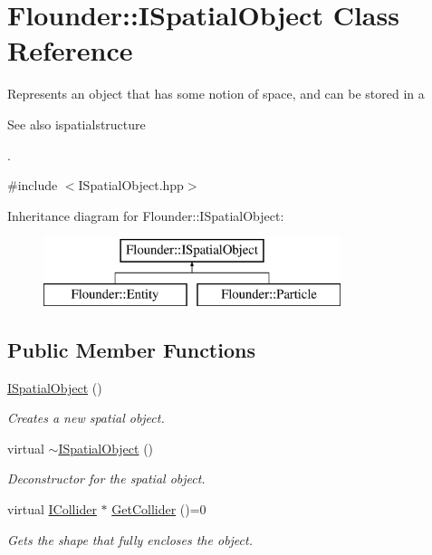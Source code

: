 \hypertarget{class_flounder_1_1_i_spatial_object}{}\section{Flounder\+:\+:I\+Spatial\+Object Class Reference}
\label{class_flounder_1_1_i_spatial_object}


Represents an object that has some notion of space, and can be stored in a \begin{DoxySeeAlso}{See also}
ispatialstructure


\end{DoxySeeAlso}
.  




{\ttfamily \#include $<$I\+Spatial\+Object.\+hpp$>$}

Inheritance diagram for Flounder\+:\+:I\+Spatial\+Object\+:\begin{figure}[H]
\begin{center}
\leavevmode
\includegraphics[height=2.000000cm]{class_flounder_1_1_i_spatial_object}
\end{center}
\end{figure}
\subsection*{Public Member Functions}
\begin{DoxyCompactItemize}
\item 
\hyperlink{class_flounder_1_1_i_spatial_object_a1e5a26ee3cef8547256f88cdc56feefb}{I\+Spatial\+Object} ()
\begin{DoxyCompactList}\small\item\em Creates a new spatial object. \end{DoxyCompactList}\item 
virtual \hyperlink{class_flounder_1_1_i_spatial_object_a146d7d07782ead201107cb8d20448a88}{$\sim$\+I\+Spatial\+Object} ()
\begin{DoxyCompactList}\small\item\em Deconstructor for the spatial object. \end{DoxyCompactList}\item 
virtual \hyperlink{class_flounder_1_1_i_collider}{I\+Collider} $\ast$ \hyperlink{class_flounder_1_1_i_spatial_object_ae1e28211dc94c4229baf284ea10ff556}{Get\+Collider} ()=0
\begin{DoxyCompactList}\small\item\em Gets the shape that fully encloses the object. \end{DoxyCompactList}\end{DoxyCompactItemize}


